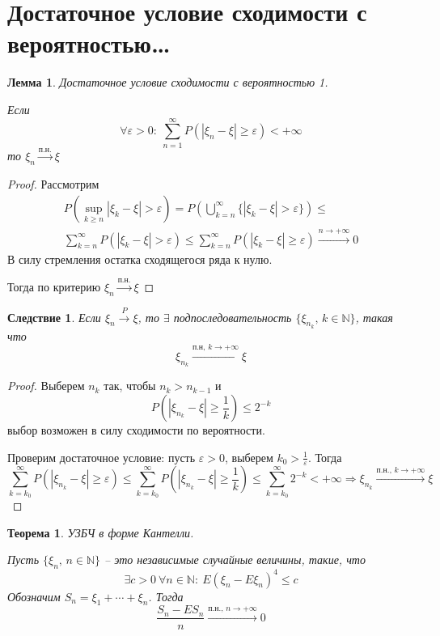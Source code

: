 \documentclass[a4paper,12pt]{article}
\renewcommand{\leq}{\ensuremath{\leqslant}}
\renewcommand{\geq}{\ensuremath{\geqslant}}
\theoremstyle{plain}
\newtheorem{theorem}{Теорема}[section]
\newtheorem{lemma}{Лемма}[section]
\newtheorem*{corollary}{Следствие}
\theoremstyle{definition}
\theoremstyle{remark}
\begin{document}
\section{Достаточное условие сходимости с вероятностью\dots}
\begin{lemma}
  Достаточное условие сходимости с вероятностью 1.

  Если 
  \[\forall \varepsilon > 0:\: \sum_{n = 1}^\infty P(|\xi_n - \xi| \geq \varepsilon) < +\infty\]
  то $\xi_n \stackrel{\text{п.н.}}{\to} \xi$
\end{lemma}

\begin{proof}
  Рассмотрим
  \begin{align*}
    P(\sup_{k \geq n}|\xi_k - \xi| > \varepsilon) = P\left(\bigcup_{k = n}^\infty \{|\xi_k - \xi| > \varepsilon\}\right) \leq\\
    \sum_{k = n}^\infty P(|\xi_k - \xi| > \varepsilon) \leq \sum_{k = n}^\infty P(|\xi_k - \xi| \geq \varepsilon) \stackrel{n \to +\infty}{\to} 0
  \end{align*}
  В силу стремления остатка сходящегося ряда к нулю.

  Тогда по критерию $\xi_n \stackrel{\text{п.н.}}{\to} \xi$
\end{proof}

\begin{corollary}
  Если $\xi_n \stackrel{P}{\to} \xi$, то $\exists$ подпоследовательность $\{\xi_{n_k},\, k \in \mathbb{N}\}$, такая что
  \[\xi_{n_k} \stackrel{\text{п.н},\, k \to +\infty}{\to} \xi\]
\end{corollary}

\begin{proof}
  Выберем $n_k$ так, чтобы $n_k > n_{k - 1}$ и 
  \[P(|\xi_{n_k} - \xi| \geq \frac{1}{k}) \leq 2^{-k}\]
  выбор возможен в силу сходимости по вероятности.

  Проверим достаточное условие: пусть $\varepsilon > 0$, выберем $k_0 > \frac{1}{\varepsilon}$. Тогда
  \[
    \sum_{k = k_0}^\infty P(|\xi_{n_k} - \xi| \geq \varepsilon) \leq \sum_{k = k_0}^\infty P(|\xi_{n_k} - \xi| \geq \frac{1}{k}) \leq \sum_{k = k_0}^\infty 2^{-k} < +\infty \Rightarrow \xi_{n_k} \stackrel{\text{п.н.},\, k \to +\infty}{\to} \xi
  \]
\end{proof}

\begin{theorem}
  УЗБЧ в форме Кантелли.

  Пусть $\{\xi_n,\, n \in \mathbb{N}\}$ -- это независимые случайные величины, такие, что
  \[\exists c > 0 \: \forall n \in \mathbb{N}:\: E(\xi_n - E\xi_n)^4 \leq c\]
  Обозначим $S_n = \xi_1 + \cdots + \xi_n$. Тогда
  \[\frac{S_n - ES_n}{n} \stackrel{\text{п.н.},\, n \to +\infty}{\to} 0\]
\end{theorem}
\end{document}
